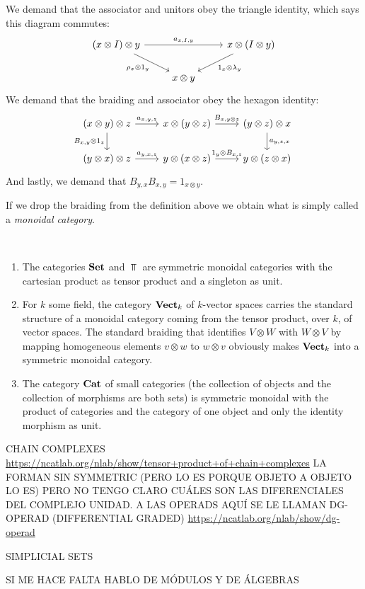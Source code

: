 \documentclass[TFM.tex]{subfiles}
\begin{document}
\begin{defi}
\[\]
We demand that the associator and unitors obey the triangle identity, which says this diagram commutes:
\[
\begin{tikzcd}
(x\otimes I)\otimes y \arrow[rr, "{a_{x,I,y}}"] \arrow[rd, "\rho_x\otimes 1_y"'] &            & x\otimes (I\otimes y) \arrow[ld, "1_x\otimes\lambda_y"] \\
                                                                                 & x\otimes y &                                                        
\end{tikzcd}
\]
We demand that the braiding and associator obey the hexagon identity:
\[
\begin{tikzcd}
(x\otimes y)\otimes z \arrow[r, "{a_{x,y,z}}"] \arrow[d, "{B_{x,y}\otimes 1_z}"'] & x\otimes (y\otimes z) \arrow[r, "{B_{x,y\otimes z}}"]   & (y\otimes z)\otimes x \arrow[d, "{a_{y,z,x}}"] \\
(y\otimes x)\otimes z \arrow[r, "{a_{y,x,z}}"]                                    & y\otimes (x\otimes z) \arrow[r, "{1_y\otimes B_{x,z}}"] & y\otimes (z\otimes x)                         
\end{tikzcd}
\]
And lastly, we demand that $B_{y,x}B_{x,y}=1_{x\otimes y}$.
\end{defi}

If we drop the braiding from the definition above we obtain what is simply called a \emph{monoidal category}.

\begin{ex}\
\begin{enumerate}
\item The categories $\mathrm{\mathbf{Set}}$ and $\Top$ are symmetric monoidal categories with the cartesian product as tensor product and a singleton as unit. 
\item For $k$ some field, the category $\mathrm{\mathbf{Vect}}_k$ of $k$-vector spaces carries the standard structure of a monoidal category coming from the tensor product, over $k$, of vector spaces. The standard braiding that identifies $V\otimes W$ with $W\otimes V$ by mapping homogeneous elements $v\otimes w$ to $w\otimes v$ obviously makes $\mathrm{\mathbf{Vect}}_k$ into a symmetric monoidal category. 

\item The category $\mathrm{\mathbf{Cat}}$ of small categories (the collection of objects and the collection of morphisms are both sets) is symmetric monoidal with the product of categories and the category of one object and only the identity morphism as unit.

\end{enumerate}
CHAIN COMPLEXES \url{https://ncatlab.org/nlab/show/tensor+product+of+chain+complexes} LA FORMAN SIN SYMMETRIC (PERO LO ES PORQUE OBJETO A OBJETO LO ES) PERO NO TENGO CLARO CUÁLES SON LAS DIFERENCIALES DEL COMPLEJO UNIDAD. A LAS OPERADS AQUÍ SE LE LLAMAN DG-OPERAD (DIFFERENTIAL GRADED) \url{https://ncatlab.org/nlab/show/dg-operad}


SIMPLICIAL SETS

SI ME HACE FALTA HABLO DE MÓDULOS Y DE ÁLGEBRAS


\end{ex}
\end{document}
